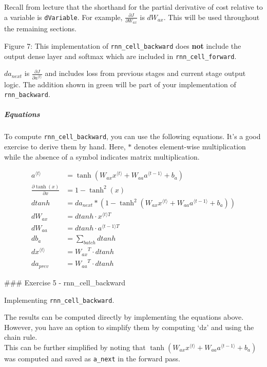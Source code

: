 \documentclass[11pt]{article}
\begin{document}
    Recall from lecture that the shorthand for the partial derivative of
cost relative to a variable is \texttt{dVariable}. For example,
\(\frac{\partial J}{\partial W_{ax}}\) is \(dW_{ax}\). This will be used
throughout the remaining sections.

    Figure 7: This implementation of \texttt{rnn\_cell\_backward} does
\textbf{not} include the output dense layer and softmax which are
included in \texttt{rnn\_cell\_forward}.

\(da_{next}\) is \(\frac{\partial{J}}{\partial a^{\langle t \rangle}}\)
and includes loss from previous stages and current stage output logic.
The addition shown in green will be part of your implementation of
\texttt{rnn\_backward}.

    \hypertarget{equations}{%
\subparagraph{Equations}\label{equations}}

To compute \texttt{rnn\_cell\_backward}, you can use the following
equations. It's a good exercise to derive them by hand. Here, \(*\)
denotes element-wise multiplication while the absence of a symbol
indicates matrix multiplication.

\begin{align}
\displaystyle a^{\langle t \rangle} &= \tanh(W_{ax} x^{\langle t \rangle} + W_{aa} a^{\langle t-1 \rangle} + b_{a})\tag{-} \\[8pt]
\displaystyle \frac{\partial \tanh(x)} {\partial x} &= 1 - \tanh^2(x) \tag{-} \\[8pt]
\displaystyle {dtanh} &= da_{next} * ( 1 - \tanh^2(W_{ax}x^{\langle t \rangle}+W_{aa} a^{\langle t-1 \rangle} + b_{a})) \tag{0} \\[8pt]
\displaystyle  {dW_{ax}} &= dtanh \cdot x^{\langle t \rangle T}\tag{1} \\[8pt]
\displaystyle dW_{aa} &= dtanh \cdot a^{\langle t-1 \rangle T}\tag{2} \\[8pt]
\displaystyle db_a& = \sum_{batch}dtanh\tag{3} \\[8pt]
\displaystyle dx^{\langle t \rangle} &= { W_{ax}}^T \cdot dtanh\tag{4} \\[8pt]
\displaystyle da_{prev} &= { W_{aa}}^T \cdot dtanh\tag{5}
\end{align}

    \#\#\# Exercise 5 - rnn\_cell\_backward

Implementing \texttt{rnn\_cell\_backward}.

The results can be computed directly by implementing the equations
above. However, you have an option to simplify them by computing `dz'
and using the chain rule.\\
This can be further simplified by noting that
\(\tanh(W_{ax}x^{\langle t \rangle}+W_{aa} a^{\langle t-1 \rangle} + b_{a})\)
was computed and saved as \texttt{a\_next} in the forward pass.
\end{document}

